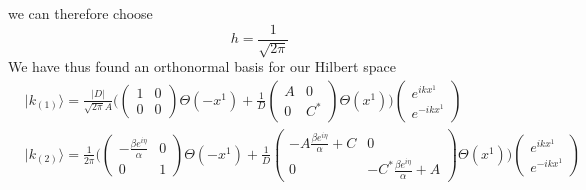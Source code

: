 we can therefore choose
\begin{equation*}
h = \frac{1}{\sqrt{2\pi}}
\end{equation*}
We have thus found an orthonormal basis for our Hilbert space
\begin{equation}
\begin{split}
& | k_{(1)} \rangle = \frac{|D|}{\sqrt{2\pi}A}\bigg( \begin{pmatrix} 1 & 0 \\ 0 & 0 \end{pmatrix}
\Theta(-x^1) + 
\frac{1}{D}\begin{pmatrix} A & 0 \\  0 & C^* \end{pmatrix} \Theta(x^1) \bigg)
\begin{pmatrix} e^{ikx^1}  \\ e^{-ikx^1} \end{pmatrix}   \\
& | k_{(2)} \rangle = \frac{1}{2\pi}
\Bigg( \begin{pmatrix} -\frac{\beta e^{i\eta}}{\alpha} & 0 \\ 0 & 1 \end{pmatrix}
\Theta(-x^1) + 
\frac{1}{D}\begin{pmatrix} -A\frac{\beta e^{i\eta}}{\alpha} + C  & 0\\ 0&  -C^*\frac{\beta e^{i\eta}}{\alpha} + A  \end{pmatrix} \Theta(x^1) \Bigg)
\begin{pmatrix} e^{ikx^1}  \\  e^{-ikx^1}  \end{pmatrix}  
\end{split}
\end{equation}







